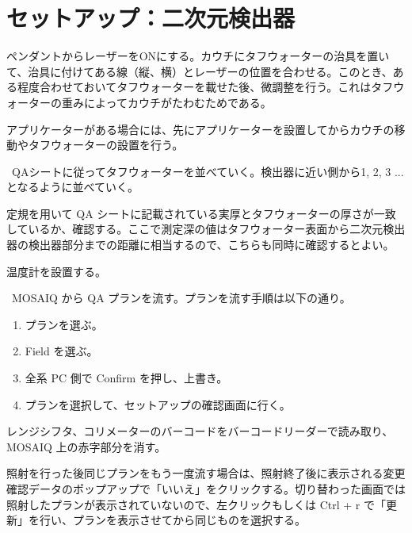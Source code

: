 \documentclass[11pt,a4paper]{jsarticle}
\newcommand{\noindot}{\noindent{$\cdot$}} %
\begin{document}
\section{セットアップ：二次元検出器}
\noindot ペンダントからレーザーをONにする。カウチにタフウォーターの治具を置いて、治具に付けてある線（縦、横）とレーザーの位置を合わせる。このとき、ある程度合わせておいてタフウォーターを載せた後、微調整を行う。これはタフウォーターの重みによってカウチがたわむためである。\par
\noindot アプリケーターがある場合には、先にアプリケーターを設置してからカウチの移動やタフウォーターの設置を行う。\par
\noindot ~QAシートに従ってタフウォーターを並べていく。検出器に近い側から1, 2, 3 ... となるように並べていく。\par
\noindot 定規を用いて QA シートに記載されている実厚とタフウォーターの厚さが一致しているか、確認する。ここで測定深の値はタフウォーター表面から二次元検出器の検出器部分までの距離に相当するので、こちらも同時に確認するとよい。\par
\noindot 温度計を設置する。\par
\noindot ~MOSAIQ から QA プランを流す。プランを流す手順は以下の通り。
	\begin{enumerate}
		\item プランを選ぶ。
		\item Field を選ぶ。
		\item 全系 PC 側で Confirm を押し、上書き。
		\item プランを選択して、セットアップの確認画面に行く。
	\end{enumerate}%
\noindot レンジシフタ、コリメーターのバーコードをバーコードリーダーで読み取り、MOSAIQ 上の赤字部分を消す。\par
\noindot 照射を行った後同じプランをもう一度流す場合は、照射終了後に表示される変更確認データのポップアップで「いいえ」をクリックする。切り替わった画面では照射したプランが表示されていないので、左クリックもしくは Ctrl + r で「更新」を行い、プランを表示させてから同じものを選択する。
%
\end{document}
